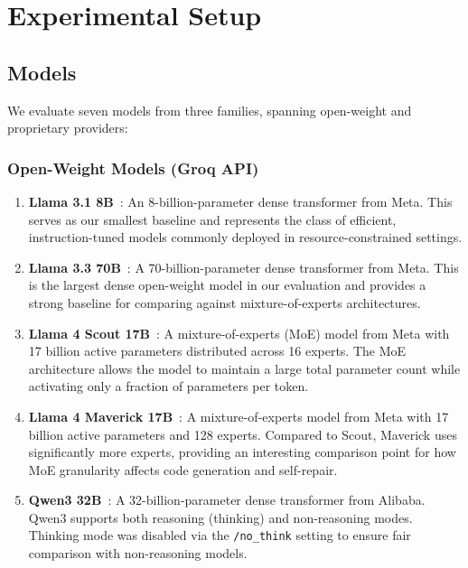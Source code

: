 \documentclass[conference]{IEEEtran}
\begin{document}
\section{Experimental Setup}
\label{sec:setup}

\subsection{Models}

We evaluate seven models from three families, spanning open-weight and proprietary providers:

\subsubsection{Open-Weight Models (Groq API)}

\begin{enumerate}
    \item \textbf{Llama 3.1 8B}~\cite{grubisic2024llama3}: An 8-billion-parameter dense transformer from Meta. This serves as our smallest baseline and represents the class of efficient, instruction-tuned models commonly deployed in resource-constrained settings.

    \item \textbf{Llama 3.3 70B}~\cite{llama33}: A 70-billion-parameter dense transformer from Meta. This is the largest dense open-weight model in our evaluation and provides a strong baseline for comparing against mixture-of-experts architectures.

    \item \textbf{Llama 4 Scout 17B}~\cite{llama4}: A mixture-of-experts (MoE) model from Meta with 17 billion active parameters distributed across 16 experts. The MoE architecture allows the model to maintain a large total parameter count while activating only a fraction of parameters per token.

    \item \textbf{Llama 4 Maverick 17B}~\cite{llama4}: A mixture-of-experts model from Meta with 17 billion active parameters and 128 experts. Compared to Scout, Maverick uses significantly more experts, providing an interesting comparison point for how MoE granularity affects code generation and self-repair.

    \item \textbf{Qwen3 32B}~\cite{qwen3}: A 32-billion-parameter dense transformer from Alibaba. Qwen3 supports both reasoning (thinking) and non-reasoning modes. Thinking mode was disabled via the \texttt{/no\_think} setting to ensure fair comparison with non-reasoning models.
\end{enumerate}
\end{document}
